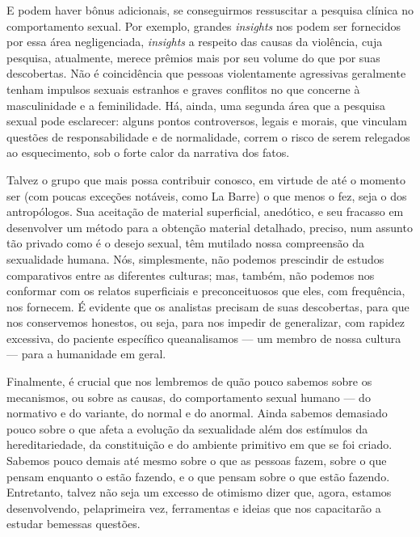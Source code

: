  E podem haver bônus adicionais, se conseguirmos ressuscitar a pesquisa
clínica no comportamento sexual. Por exemplo, grandes \textit{insights}
nos podem ser fornecidos por essa área negligenciada, \textit{insights}
a respeito das causas da violência,\idxagres{} cuja pesquisa, atualmente, merece
prêmios mais por seu volume do que por suas descobertas. Não é
coincidência que pessoas violentamente agressivas geralmente tenham
impulsos sexuais estranhos e graves conflitos no que concerne à
masculinidade e a feminilidade. Há, ainda, uma segunda área que a
pesquisa sexual pode esclarecer: alguns pontos controversos, legais e
morais, que vinculam questões de responsabilidade e de normalidade,
correm o risco de serem relegados ao esquecimento, sob o forte calor
da narrativa dos fatos.

 Talvez o grupo que mais possa contribuir conosco, em virtude de até o
momento ser (com poucas exceções notáveis, como La Barre)\idxbarre{} o que menos o
fez, seja o dos antropólogos.\idxantro{} Sua aceitação de material superficial,
anedótico, e seu fracasso em desenvolver um método para a obtenção
material detalhado, preciso, num assunto tão privado como é o desejo
sexual, têm mutilado nossa compreensão da sexualidade humana. Nós,
simplesmente, não podemos prescindir de estudos comparativos entre as
diferentes culturas; mas, também, não podemos nos conformar com os
relatos superficiais e preconceituosos que eles, com frequência, nos
fornecem. É evidente que os analistas precisam de suas descobertas,
para que nos conservemos honestos, ou seja, para nos impedir de
generalizar, com rapidez excessiva, do paciente específico que\idxsexopmeto[|)]
analisamos --- um membro de nossa cultura --- para a humanidade em geral.

 Finalmente, é crucial que nos lembremos de quão pouco sabemos sobre os
mecanismos, ou sobre as causas, do comportamento sexual humano --- do
normativo e do variante, do normal e do anormal. Ainda sabemos
demasiado pouco sobre o que afeta a evolução da sexualidade além dos
estímulos da hereditariedade, da constituição e do ambiente primitivo
em que se foi criado. Sabemos pouco demais até mesmo sobre o que as
pessoas fazem, sobre o que pensam enquanto o estão fazendo, e o que
pensam sobre o que estão fazendo. Entretanto, talvez não seja um
excesso de otimismo dizer que, agora, estamos desenvolvendo, pela\idxrela[|)]
primeira vez, ferramentas e ideias que nos capacitarão a estudar bem\idxsexop[|)]
essas questões.




